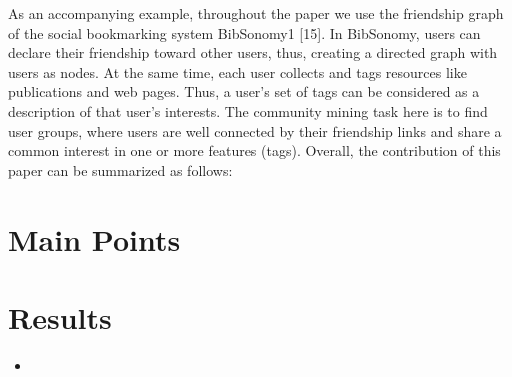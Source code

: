 \documentclass[a4paper]{article}
\begin{document}
As an accompanying example, throughout the paper we use the friendship graph of the social bookmarking system BibSonomy1 [15]. In BibSonomy, users can declare their friendship toward other users, thus, creating a directed graph with users as nodes. At the same time, each user collects and tags resources like publications and web pages. Thus, a user’s set of tags can be considered as a description of that user’s interests. The community mining task here is to find user groups, where users are well connected by their friendship links and share a common interest in one or more features (tags).
Overall, the contribution of this paper can be summarized as follows:

\section{Main Points}


\section{Results}
\begin{itemize}
  \item
\end{itemize}
\end{document}
